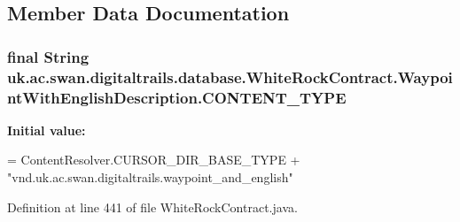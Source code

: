 \subsection{Member Data Documentation}
\hypertarget{classuk_1_1ac_1_1swan_1_1digitaltrails_1_1database_1_1_white_rock_contract_1_1_waypoint_with_english_description_affea3241f7907de53fa9d67901a39f2d}{
\subsubsection[{C\+O\+N\+T\+E\+N\+T\+\_\+\+T\+Y\+P\+E}]{\setlength{\rightskip}{0pt plus 5cm}final String uk.\+ac.\+swan.\+digitaltrails.\+database.\+White\+Rock\+Contract.\+Waypoint\+With\+English\+Description.\+C\+O\+N\+T\+E\+N\+T\+\_\+\+T\+Y\+P\+E\hspace{0.3cm}{\ttfamily [static]}}}\label{classuk_1_1ac_1_1swan_1_1digitaltrails_1_1database_1_1_white_rock_contract_1_1_waypoint_with_english_description_affea3241f7907de53fa9d67901a39f2d}
{\bfseries Initial value\+:}
\begin{DoxyCode}
= ContentResolver.CURSOR\_DIR\_BASE\_TYPE +
                \textcolor{stringliteral}{"vnd.uk.ac.swan.digitaltrails.waypoint\_and\_english"}
\end{DoxyCode}


Definition at line 441 of file White\+Rock\+Contract.\+java.

